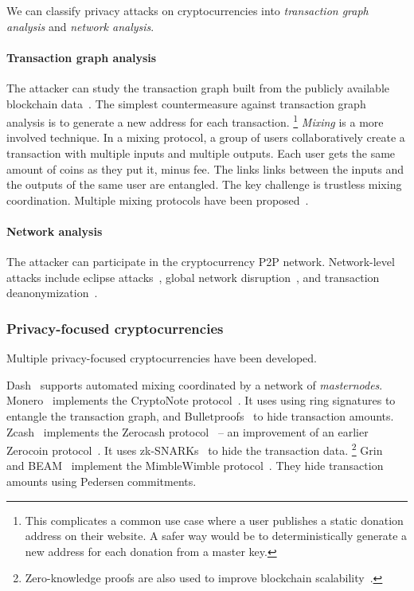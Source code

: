 We can classify privacy attacks on cryptocurrencies into \textit{transaction graph analysis} and \textit{network analysis}.

\paragraph{Transaction graph analysis}
The attacker can study the transaction graph built from the publicly available blockchain data~\cite{Meiklejohn2013, Ober2013, Ron2013}.
The simplest countermeasure against transaction graph analysis is to generate a new address for each transaction.
\footnote{This complicates a common use case where a user publishes a static donation address on their website. A safer way would be to deterministically generate a new address for each donation from a master key.}
\textit{Mixing} is a more involved technique.
In a mixing protocol, a group of users collaboratively create a transaction with multiple inputs and multiple outputs.
Each user gets the same amount of coins as they put it, minus fee.
The links links between the inputs and the outputs of the same user are entangled.
The key challenge is trustless mixing coordination.
Multiple mixing protocols have been proposed~\cite{Maxwell2013, Bonneau2014, Ruffing2014, Valenta2015}.

\paragraph{Network analysis}
The attacker can participate in the cryptocurrency P2P network.
Network-level attacks include eclipse attacks~\cite{Marcus2018, Henningsen2019}, global network disruption~\cite{Apostolaki2017}, and transaction deanonymization~\cite{Biryukov2014}.


\subsubsection*{Privacy-focused cryptocurrencies}

Multiple privacy-focused cryptocurrencies have been developed.

Dash~\cite{Dash} supports automated mixing coordinated by a network of \textit{masternodes}.
Monero~\cite{Monero} implements the CryptoNote protocol~\cite{Saberhagen2013}.
It uses using ring signatures to entangle the transaction graph, and Bulletproofs~\cite{Buenz2018} to hide transaction amounts.
Zcash~\cite{Zcash} implements the Zerocash protocol~\cite{BenSasson2014, Hopwood2020} -- an improvement of an earlier Zerocoin protocol~\cite{Miers2013}.
It uses zk-SNARKs~\cite{BenSasson2014a} to hide the transaction data.
\footnote{Zero-knowledge proofs are also used to improve blockchain scalability~\cite{Bonneau2020}.}
Grin~\cite{Grin} and BEAM~\cite{Beam} implement the MimbleWimble protocol~\cite{Jedusor2016}.
They hide transaction amounts using Pedersen commitments.

